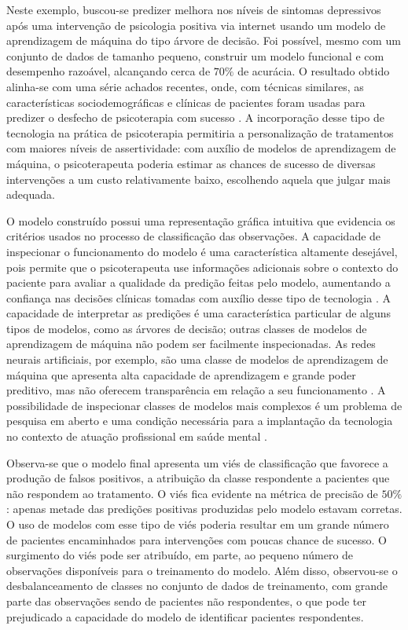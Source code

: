 Neste exemplo, buscou-se predizer melhora nos níveis de sintomas depressivos após uma intervenção de psicologia positiva via internet usando um modelo de aprendizagem de máquina do tipo árvore de
decisão. Foi possível, mesmo com um conjunto de dados de tamanho pequeno, construir um modelo funcional e com desempenho razoável, alcançando cerca de $70\%$ de acurácia. O resultado obtido alinha-se
com uma série achados recentes, onde, com técnicas similares, as características sociodemográficas e clínicas de pacientes foram usadas para predizer o desfecho de psicoterapia com sucesso \cite{Collins2023, Hornstein2021}.
A incorporação desse tipo de tecnologia na prática de psicoterapia permitiria a personalização de tratamentos com maiores níveis de assertividade: com auxílio de modelos de aprendizagem de máquina, o
psicoterapeuta poderia estimar as chances de sucesso de diversas intervenções a um custo relativamente baixo, escolhendo aquela que julgar mais adequada.

O modelo construído possui uma representação gráfica intuitiva que evidencia os critérios usados no processo de classificação das observações. A capacidade de inspecionar o funcionamento do modelo
é uma característica altamente desejável, pois permite que o psicoterapeuta use informações adicionais sobre o contexto do paciente para avaliar a qualidade da predição feitas pelo modelo, aumentando
a confiança nas decisões clínicas tomadas com auxílio desse tipo de tecnologia \cite{Stiglic2020, WHO2023}. A capacidade de interpretar as predições é uma característica particular de alguns tipos de modelos,
como as árvores de decisão; outras classes de modelos de aprendizagem de máquina não podem ser facilmente inspecionadas. As redes neurais artificiais, por exemplo, são uma classe de modelos de aprendizagem
de máquina que apresenta alta capacidade de aprendizagem e grande poder preditivo, mas não oferecem transparência em relação a seu funcionamento \cite{Stiglic2020}. A possibilidade de inspecionar classes
de modelos mais complexos é um problema de pesquisa em aberto e uma condição necessária para a implantação da tecnologia no contexto de atuação profissional em saúde mental \cite{Stiglic2020, WHO2023}.

Observa-se que o modelo final apresenta um viés de classificação que favorece a produção de falsos positivos, a atribuição da classe respondente a pacientes que não respondem ao tratamento. O viés fica evidente
na métrica de precisão de $50\%$: apenas metade das predições positivas produzidas pelo modelo estavam corretas. O uso de modelos com esse tipo de viés poderia resultar em um grande número de pacientes encaminhados
para intervenções com poucas chance de sucesso. O surgimento do viés pode ser atribuído, em parte, ao pequeno número de observações disponíveis para o treinamento do modelo. Além disso, observou-se o desbalanceamento
de classes no conjunto de dados de treinamento, com grande parte das observações sendo de pacientes não respondentes, o que pode ter prejudicado a capacidade do modelo de identificar pacientes respondentes.